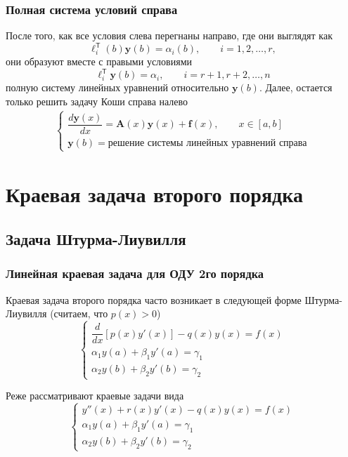 \documentclass[professionalfonts,compress,unicode,aspectratio=169]{beamer}
\begin{document}
\begin{frame}\frametitle{Полная система условий справа}
	После того, как все условия слева перегнаны направо, где они выглядят как
	\[
	\boldsymbol{\ell}^\mathsf{T}_i(b) \mathbf{y}(b) = \alpha_i(b), \qquad i = 1,
	2, \dots, r,
	\]
	они образуют вместе с правыми условиями 
	\[
	\boldsymbol{\ell}^\mathsf{T}_i \mathbf{y}(b) = \alpha_i, \qquad i = r+1,
	r+2, \dots, n
	\]
	полную систему линейных уравнений относительно $\mathbf{y}(b)$. Далее,
	остается только решить задачу Коши справа налево
	\begin{gather*}
	\begin{cases}
	\dfrac{d\mathbf{y}(x)}{dx} = \mathbf{A}(x) \mathbf{y}(x) + \mathbf{f}(x), \qquad x \in [a,b]\\
	\mathbf{y}(b) = \text{решение системы линейных уравнений справа}
	\end{cases}
	\end{gather*}
\end{frame}

\section{Краевая задача второго порядка}
\subsection{Задача Штурма-Лиувилля}
\begin{frame}\frametitle{Линейная краевая задача для ОДУ 2го порядка}
	Краевая задача второго порядка часто возникает в следующей форме
	Штурма-Лиувилля (считаем, что $p(x) > 0$)
	\[\begin{cases}
		\dfrac{d}{dx}\left[p(x)y'(x)\right] - q(x) y(x) = f(x)\\
		\alpha_1 y(a) + \beta_1 y'(a) = \gamma_1\\
		\alpha_2 y(b) + \beta_2 y'(b) = \gamma_2
	\end{cases}\]

	Реже рассматривают краевые задачи вида
	\[\begin{cases}
		y''(x) + r(x)y'(x) - q(x) y(x) = f(x)\\
		\alpha_1 y(a) + \beta_1 y'(a) = \gamma_1\\
		\alpha_2 y(b) + \beta_2 y'(b) = \gamma_2
	\end{cases}\]
\end{frame}
\end{document}
